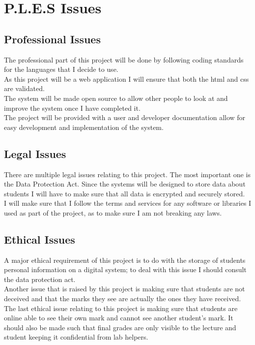 \documentclass[12pt]{article}  %
\begin{document}
\newpage


\section{P.L.E.S Issues}


\subsection{Professional Issues}
The professional part of this project will be done by following coding standards for the languages that I decide to use.\\
As this project will be a web application I will ensure that both the html and css are validated.\\
The system will be made open source to allow other people to look at and improve the system once I have completed it.\\
The project will be provided with a  user and developer documentation allow for easy development and implementation of the system.


\subsection{Legal Issues}
There are multiple legal issues relating to this project. The most important one is the Data Protection Act. Since the systems will be designed to store data about students I will have to make sure that all data is encrypted and securely stored.\\
I will make sure that I follow the terms and services for any software or libraries I used as part of the project, as to make sure I am not breaking any laws.


\subsection{Ethical Issues}
A major ethical requirement of this project is to do with the storage of students personal information on a digital system; to deal with this issue I should consult the data protection act. \\
Another issue that is raised by this project is making sure that students are not deceived and that the marks they see are actually the ones they have received.\\
The last ethical issue relating to this project is making sure that students are online able to see their own mark and cannot see another student's mark. It should also be made such that final grades are only visible to the lecture and student keeping it confidential from lab helpers.
\end{document}
